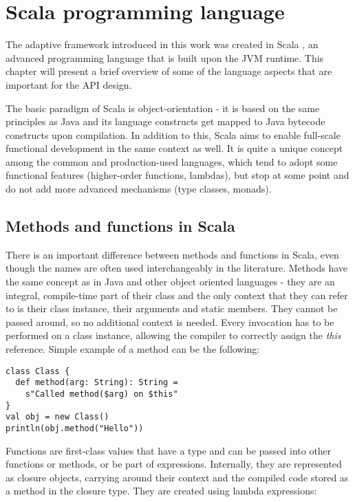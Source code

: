 \chapter{Scala programming language}
\label{chap:scala}

The adaptive framework introduced in this work was created in Scala \cite{noauthor_scala_nodate}, an advanced programming language that is built upon the JVM runtime. This chapter will present a brief overview of some of the language aspects that are important for the API design.

The basic paradigm of Scala is object-orientation - it is based on the same principles as Java and its language constructs get mapped to Java bytecode constructs upon compilation. In addition to this, Scala aims to enable full-scale functional development in the same context as well. It is quite a unique concept among the common and production-used languages, which tend to adopt some functional features (higher-order functions, lambdas), but stop at some point and do not add more advanced mechanisms (type classes, monads).

\section{Methods and functions in Scala}
\label{sec:metandfun}

There is an important difference between methods and functions in Scala, even though the names are often used interchangeably in the literature. Methods have the same concept as in Java and other object oriented languages - they are an integral, compile-time part of their class and the only context that they can refer to is their class instance, their arguments and static members. They cannot be passed around, so no additional context is needed. Every invocation has to be performed on a class instance, allowing the compiler to correctly assign the \textit{this} reference. Simple example of a method can be the following:

\lstset{style=Scala}
\begin{lstlisting}
class Class {
  def method(arg: String): String = 
    s"Called method($arg) on $this"
}
val obj = new Class()
println(obj.method("Hello"))
\end{lstlisting}

Functions are first-class values that have a type and can be passed into other functions or methods, or be part of expressions. Internally, they are represented as closure objects, carrying around their context and the compiled code stored as a method in the closure type. They are created using lambda expressions:

